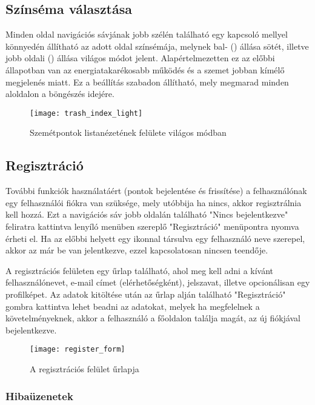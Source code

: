 \subsection{Színséma választása}

Minden oldal navigációs sávjának jobb szélén található egy kapcsoló mellyel könnyedén állítható az adott oldal színsémája, melynek bal- () állása sötét, illetve jobb oldali () állása világos módot jelent. Alapértelmezetten ez az előbbi állapotban van az energiatakarékosabb működés és a szemet jobban kímélő megjelenés miatt. Ez a beállítás szabadon állítható, mely megmarad minden aloldalon a böngészés idejére.

\begin{figure}[H]
	\centering
	\texttt{[image: trash\_index\_light]}
	\caption{Szemétpontok listanézetének felülete világos módban}
	\label{fig:trash_index_light}
\end{figure}

\subsection{Regisztráció}
\label{subsec:register}

További funkciók használatáért (pontok bejelentése és frissítése) a felhasználónak egy felhasználói fiókra van szüksége, mely utóbbija ha nincs, akkor regisztrálnia kell hozzá. Ezt a navigációs sáv jobb oldalán található "Nincs bejelentkezve" feliratra kattintva lenyíló menüben szereplő "Regisztráció" menüpontra nyomva érheti el. Ha az előbbi helyett egy  ikonnal társulva egy felhasználó neve szerepel, akkor az már be van jelentkezve, ezzel kapcsolatosan nincsen teendője.\par
A regisztrációs felületen egy űrlap található, ahol meg kell adni a kívánt felhasználónevet, e-mail címet (elérhetőségként), jelszavat, illetve opcionálisan egy profilképet. Az adatok kitöltése után az űrlap alján található "Regisztráció" gombra kattintva lehet beadni az adatokat, melyek ha megfelelnek a követelményeknek, akkor a felhasználó a főoldalon találja magát, az új fiókjával bejelentkezve.

\begin{figure}[H]
	\centering
	\texttt{[image: register\_form]}
	\caption{A regisztrációs felület űrlapja}
	\label{fig:register_form}
\end{figure}

\subsubsection{Hibaüzenetek}
\label{subsubsec:user_register_errors}

